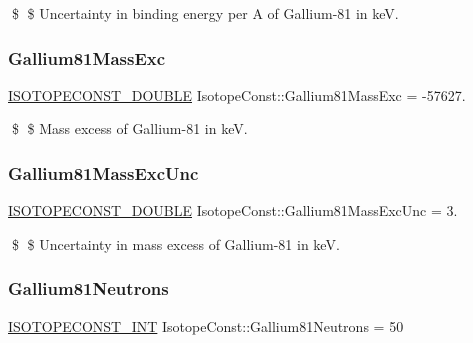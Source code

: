 \$ \$ Uncertainty in binding energy per A of Gallium-\/81 in keV. \mbox{\label{group___isotope_const-_gallium-_ga81_gaeca910d5380dd0e46389cc42952ef403}} 
\subsubsection{\texorpdfstring{Gallium81\+Mass\+Exc}{Gallium81MassExc}}
{\footnotesize\ttfamily \mbox{\hyperlink{group___isotope_const-_macros_ga8f45a7272ce02c0b4c65c44636ed719a}{I\+S\+O\+T\+O\+P\+E\+C\+O\+N\+S\+T\+\_\+\+D\+O\+U\+B\+LE}} Isotope\+Const\+::\+Gallium81\+Mass\+Exc = -\/57627.}

\$ \$ Mass excess of Gallium-\/81 in keV. \mbox{\label{group___isotope_const-_gallium-_ga81_ga719c4f5d1e9c83369f01ae742659649a}} 
\subsubsection{\texorpdfstring{Gallium81\+Mass\+Exc\+Unc}{Gallium81MassExcUnc}}
{\footnotesize\ttfamily \mbox{\hyperlink{group___isotope_const-_macros_ga8f45a7272ce02c0b4c65c44636ed719a}{I\+S\+O\+T\+O\+P\+E\+C\+O\+N\+S\+T\+\_\+\+D\+O\+U\+B\+LE}} Isotope\+Const\+::\+Gallium81\+Mass\+Exc\+Unc = 3.}

\$ \$ Uncertainty in mass excess of Gallium-\/81 in keV. \mbox{\label{group___isotope_const-_gallium-_ga81_gad951720ebdf4c976bb3582502adef814}} 
\subsubsection{\texorpdfstring{Gallium81\+Neutrons}{Gallium81Neutrons}}
{\footnotesize\ttfamily \mbox{\hyperlink{group___isotope_const-_macros_ga5f18360b3e99483a35c32d789e62621c}{I\+S\+O\+T\+O\+P\+E\+C\+O\+N\+S\+T\+\_\+\+I\+NT}} Isotope\+Const\+::\+Gallium81\+Neutrons = 50}


